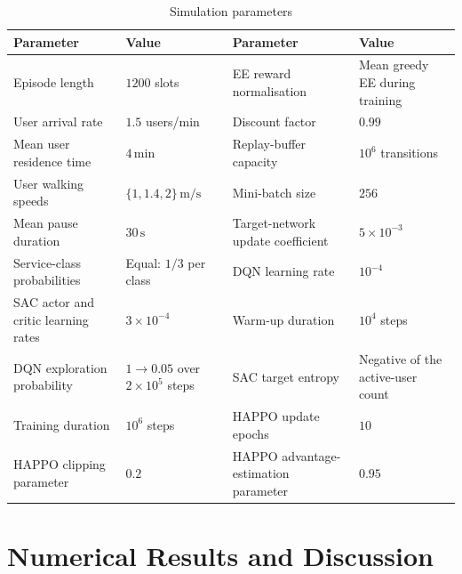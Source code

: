 \documentclass[journal]{IEEEtran}
\begin{document}
\begin{table}[t]
\caption{Simulation parameters}
\label{tab:simulation_parameters}
\centering
\scriptsize
\setlength{\tabcolsep}{4pt}
\renewcommand{\arraystretch}{1.15}
\begin{tabularx}{\textwidth}{
    @{}>{\raggedright\arraybackslash}X
       >{\raggedright\arraybackslash}X|
       >{\raggedright\arraybackslash}X
       >{\raggedright\arraybackslash}X@{}}
\hline
Parameter & Value & Parameter & Value \\
\hline
Episode length
& $1200$ slots
& EE reward normalisation
& Mean greedy EE during training \\

User arrival rate
& $1.5$ users/min
& Discount factor
& $0.99$ \\

Mean user residence time
& $4\,\mathrm{min}$
& Replay-buffer capacity
& $10^{6}$ transitions \\

User walking speeds
& $\{1,1.4,2\}\,\mathrm{m/s}$
& Mini-batch size
& $256$ \\

Mean pause duration
& $30\,\mathrm{s}$
& Target-network update coefficient
& $5\times10^{-3}$ \\

Service-class probabilities
& Equal: $1/3$ per class
& DQN learning rate
& $10^{-4}$ \\

SAC actor and critic learning rates
& $3\times10^{-4}$
& Warm-up duration
& $10^{4}$ steps \\

DQN exploration probability
& $1\rightarrow0.05$ over $2\times10^{5}$ steps
& SAC target entropy
& Negative of the active-user count \\

Training duration
& $10^{6}$ steps
& HAPPO update epochs
& $10$ \\

HAPPO clipping parameter
& $0.2$
& HAPPO advantage-estimation parameter
& $0.95$ \\
\hline
\end{tabularx}
\end{table}

\section{Numerical Results and Discussion}
\label{sec:numerical_results}
\end{document}
